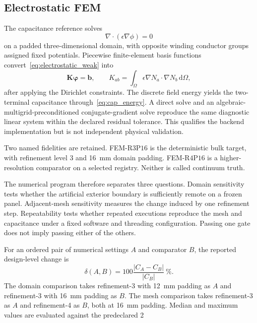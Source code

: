 \documentclass[journal]{IEEEtran}
\newcommand{\Rthree}{\mathrm{R3P16}}
\newcommand{\Rfour}{\mathrm{R4P16}}
\begin{document}
\subsection{Electrostatic FEM}
The capacitance reference solves
\begin{equation}
\nabla\cdot(\epsilon\nabla\phi)=0
\end{equation}
on a padded three-dimensional domain, with opposite winding conductor groups assigned fixed potentials. Piecewise finite-element basis functions convert~\eqref{eq:electrostatic_weak} into
\begin{equation}
\mathbf{K}\boldsymbol{\varphi}=\mathbf{b},
\qquad
K_{ab}=\int_{\Omega}\epsilon\nabla N_a\cdot\nabla N_b\,\mathrm{d}\Omega,
\label{eq:fem_system}
\end{equation}
after applying the Dirichlet constraints. The discrete field energy yields the two-terminal capacitance through~\eqref{eq:cap_energy}. A direct solve and an algebraic-multigrid-preconditioned conjugate-gradient solve reproduce the same diagnostic linear system within the declared residual tolerance. This qualifies the backend implementation but is not independent physical validation.

Two named fidelities are retained. FEM-$\Rthree$ is the deterministic bulk target, with refinement level 3 and 16~mm domain padding. FEM-$\Rfour$ is a higher-resolution comparator on a selected registry. Neither is called continuum truth.

The numerical program therefore separates three questions. Domain sensitivity tests whether the artificial exterior boundary is sufficiently remote on a frozen panel. Adjacent-mesh sensitivity measures the change induced by one refinement step. Repeatability tests whether repeated executions reproduce the mesh and capacitance under a fixed software and threading configuration. Passing one gate does not imply passing either of the others.

For an ordered pair of numerical settings $A$ and comparator $B$, the reported design-level change is
\begin{equation}
\delta(A,B)=100\frac{|C_A-C_B|}{|C_B|}\ \%.
\label{eq:fidelity_delta}
\end{equation}
The domain comparison takes refinement-3 with 12~mm padding as $A$ and refinement-3 with 16~mm padding as $B$. The mesh comparison takes refinement-3 as $A$ and refinement-4 as $B$, both at 16~mm padding. Median and maximum values are evaluated against the predeclared 2%
\end{document}
